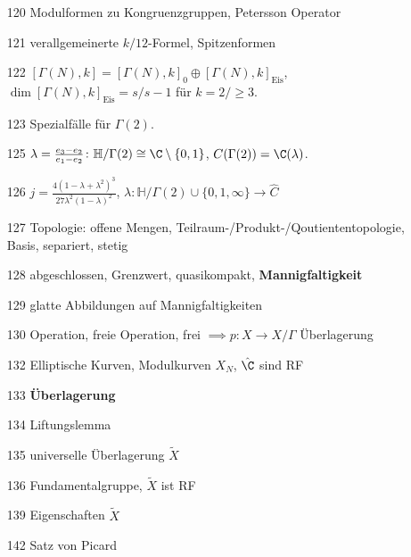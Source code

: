 \documentclass{article}
\begin{document}
\begin{itemize}
    \item[120] Modulformen zu Kongruenzgruppen, Petersson Operator
    \item[121] verallgemeinerte $k/12$-Formel, Spitzenformen
    \item[122] $[\Gamma(N), k] = [\Gamma(N), k]_0 \oplus [\Gamma(N), k]_{\mathrm{Eis}}$, $\operatorname{\dim}[\Gamma(N), k]_{\mathrm{Eis}} = s/s-1$ für $k = 2/\geq 3$.
    \item[123] Spezialfälle für $\Gamma(2)$.
    \item[125] $\lambda = \frac{e_3 - e_2}{e_1 - e_2}\colon \mathbb{H}/\Gamma(2) \cong \C\setminus\{0,1\}$, $C(\Gamma(2)) = \C(\lambda)$.
    \item[126] $j = \frac{4(1-\lambda + \lambda^2)^3}{27\lambda^2(1-\lambda)^2}$, $\lambda\colon \mathbb{H}/\Gamma(2) \cup \{0,1,\infty\} \to \hat C$  
\end{itemize}
\newpage
\begin{itemize}
    \item[127] Topologie: offene Mengen, Teilraum-/Produkt-/Qoutiententopologie, Basis, separiert, stetig
    \item[128] abgeschlossen, Grenzwert, quasikompakt, \textbf{Mannigfaltigkeit}
    \item[129] glatte Abbildungen auf Mannigfaltigkeiten
    \item[130] Operation, freie Operation, frei $ \implies p \colon X \to X/\Gamma$ Überlagerung
    \item[132] Elliptische Kurven, Modulkurven $X_N$, $\hat \C$ sind RF
    \item[133] \textbf{Überlagerung}
    \item[134] Liftungslemma
    \item[135] universelle Überlagerung $\tilde X$
    \item[136] Fundamentalgruppe, $\tilde X$ ist RF
    \item[139] Eigenschaften $\tilde X$ 
    \item[142] Satz von Picard 
\end{itemize}
\end{document}
